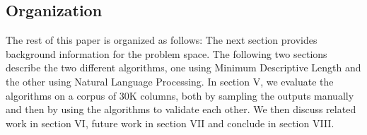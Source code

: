 \subsection{Organization}
The rest of this paper is organized as follows: The next section provides background information for the problem space. The following two sections describe the two different algorithms, one using Minimum Descriptive Length and the other using Natural Language Processing. In section V, we evaluate the algorithms on a corpus of 30K columns, both by sampling the outputs manually and then by using the algorithms to validate each other. We then discuss related work in section VI, future work in section VII and conclude in section VIII.
